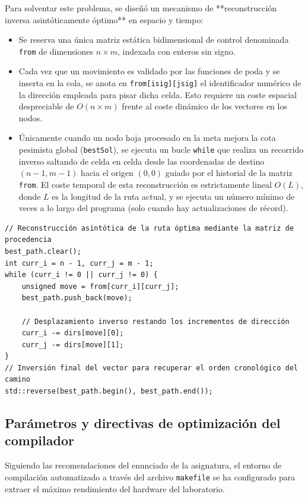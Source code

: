 \documentclass[11pt,a4paper]{article}
\begin{document}
Para solventar este problema, se diseñó un mecanismo de **reconstrucción inversa asintóticamente óptimo** en espacio y tiempo:
\begin{itemize}
    \item Se reserva una única matriz estática bidimensional de control denominada \texttt{from} de dimensiones $n \times m$, indexada con enteros sin signo.
    \item Cada vez que un movimiento es validado por las funciones de poda y se inserta en la cola, se anota en \texttt{from[isig][jsig]} el identificador numérico de la dirección empleada para pisar dicha celda. Esto requiere un coste espacial despreciable de $O(n \times m)$ frente al coste dinámico de los vectores en los nodos.
    \item Únicamente cuando un nodo hoja procesado en la meta mejora la cota pesimista global (\texttt{bestSol}), se ejecuta un bucle \texttt{while} que realiza un recorrido inverso saltando de celda en celda desde las coordenadas de destino $(n-1, m-1)$ hacia el origen $(0,0)$ guiado por el historial de la matriz \texttt{from}. El coste temporal de esta reconstrucción es estrictamente lineal $O(L)$, donde $L$ es la longitud de la ruta actual, y se ejecuta un número mínimo de veces a lo largo del programa (solo cuando hay actualizaciones de récord).
\end{itemize}

\newpage

\begin{lstlisting}[caption={Algoritmo de reconstrucción inversa en el nodo hoja}, label={lst:reconstruccion}]
// Reconstrucción asintótica de la ruta óptima mediante la matriz de procedencia
best_path.clear();
int curr_i = n - 1, curr_j = m - 1;
while (curr_i != 0 || curr_j != 0) {
    unsigned move = from[curr_i][curr_j];
    best_path.push_back(move);

    // Desplazamiento inverso restando los incrementos de dirección
    curr_i -= dirs[move][0];
    curr_j -= dirs[move][1];
}
// Inversión final del vector para recuperar el orden cronológico del camino
std::reverse(best_path.begin(), best_path.end());
\end{lstlisting}

\subsection{Parámetros y directivas de optimización del compilador}
Siguiendo las recomendaciones del enunciado de la asignatura, el entorno de compilación automatizado a través del archivo \texttt{makefile} se ha configurado para extraer el máximo rendimiento del hardware del laboratorio.
\end{document}
